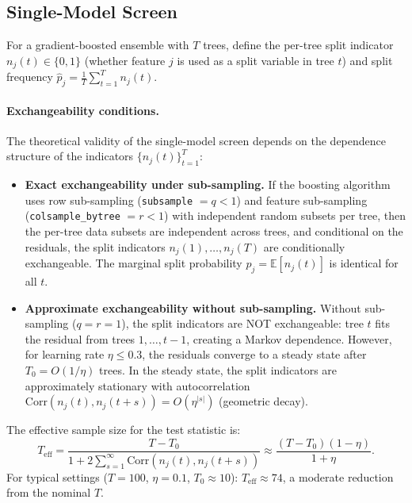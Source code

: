 \documentclass{jmlr}
\newcommand{\E}{\mathbb{E}}
\begin{document}
\subsection{Single-Model Screen}
\label{sec:f5}

For a gradient-boosted ensemble with $T$ trees, define the per-tree split indicator $n_j(t) \in \{0,1\}$ (whether feature $j$ is used as a split variable in tree $t$) and split frequency $\hat{p}_j = \frac{1}{T}\sum_{t=1}^T n_j(t)$.

\paragraph{Exchangeability conditions.}
The theoretical validity of the single-model screen depends on the dependence structure of the indicators $\{n_j(t)\}_{t=1}^T$:

\begin{itemize}
    \item \textbf{Exact exchangeability under sub-sampling.} If the boosting algorithm uses row sub-sampling (\texttt{subsample} $= q < 1$) and feature sub-sampling (\texttt{colsample\_bytree} $= r < 1$) with independent random subsets per tree, then the per-tree data subsets are independent across trees, and conditional on the residuals, the split indicators $n_j(1), \ldots, n_j(T)$ are conditionally exchangeable. The marginal split probability $p_j = \E[n_j(t)]$ is identical for all $t$.

    \item \textbf{Approximate exchangeability without sub-sampling.} Without sub-sampling ($q = r = 1$), the split indicators are NOT exchangeable: tree $t$ fits the residual from trees $1, \ldots, t-1$, creating a Markov dependence. However, for learning rate $\eta \leq 0.3$, the residuals converge to a steady state after $T_0 = O(1/\eta)$ trees. In the steady state, the split indicators are approximately stationary with autocorrelation $\text{Corr}(n_j(t), n_j(t+s)) = O(\eta^{|s|})$ (geometric decay).
\end{itemize}

The effective sample size for the test statistic is:
\[
    T_{\text{eff}} = \frac{T - T_0}{1 + 2\sum_{s=1}^\infty \text{Corr}(n_j(t), n_j(t+s))} \approx \frac{(T - T_0)(1 - \eta)}{1 + \eta}.
\]
For typical settings ($T = 100$, $\eta = 0.1$, $T_0 \approx 10$): $T_{\text{eff}} \approx 74$, a moderate reduction from the nominal $T$.
\end{document}
